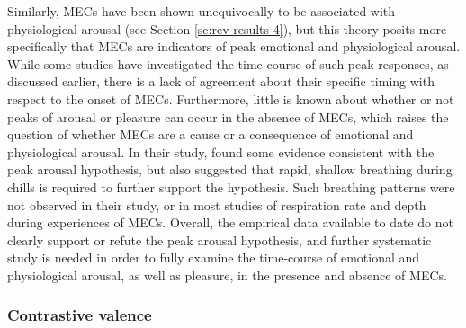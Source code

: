 Similarly, MECs have been shown unequivocally to be associated with physiological arousal (see Section \ref{se:rev-results-4}), but this theory posits more specifically that MECs are indicators of peak emotional and physiological arousal. While some studies have investigated the time-course of such peak responses, as discussed earlier, there is a lack of agreement about their specific timing with respect to the onset of MECs. Furthermore, little is known about whether or not peaks of arousal or pleasure can occur in the absence of MECs, which raises the question of whether MECs are a cause or a consequence of emotional and physiological arousal. In their study, \textcite{benedek2011} found some evidence consistent with the peak arousal hypothesis, but also suggested that rapid, shallow breathing during chills is required to further support the hypothesis. Such breathing patterns were not observed in their study, or in most studies of respiration rate and depth during experiences of MECs. Overall, the empirical data available to date do not clearly support or refute the peak arousal hypothesis, and further systematic study is needed in order to fully examine the time-course of emotional and physiological arousal, as well as pleasure, in the presence and absence of MECs.

\subsubsection{Contrastive valence}

